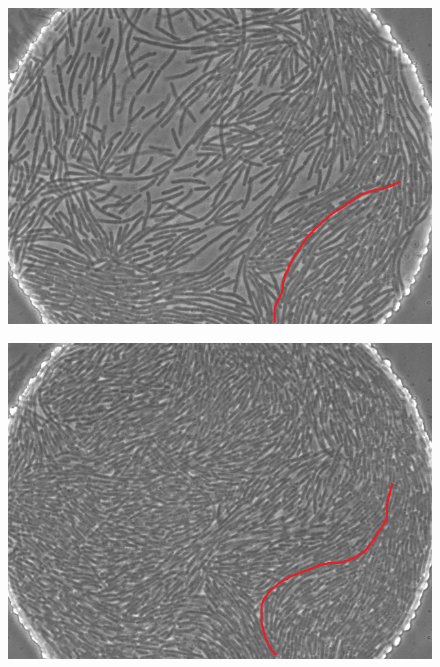 \documentclass[a4paper,11pt]{jsarticle}
\begin{document}
  \begin{figure}[htbp]
    \centering
    \begin{minipage}{0.45\linewidth}
      \centering
      \includegraphics[width=\columnwidth]{Series015_t090000_RAW_ch00.png}
      \label{fig:06_1_pt}
    \end{minipage}
    \begin{minipage}{0.45\linewidth}
      \centering
      \includegraphics[width=\columnwidth]{Series015_t120000_RAW_ch00.png}
      \label{fig:06_2_pt}
    \end{minipage}
    \begin{minipage}{0.45\linewidth}
      \centering

\end{minipage}
\end{figure}
\end{document}
